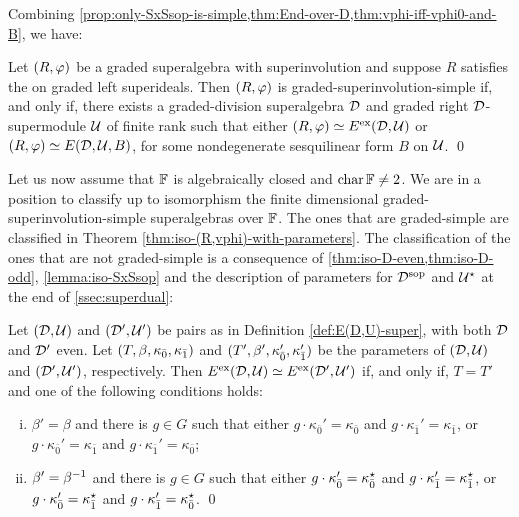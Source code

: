 Combining \cref{prop:only-SxSsop-is-simple,thm:End-over-D,thm:vphi-iff-vphi0-and-B}, we have:

\begin{cor}\label{cor:SxSsop-with-dcc}
    Let $(R, \varphi)$ be a graded superalgebra with superinvolution and suppose $R$ satisfies the \dcc on graded left superideals. 
    Then $(R, \varphi)$ is graded-superinvolution-simple if, and only if, there exists a graded-division superalgebra $\mathcal{D}$ and graded right $\mathcal{D}$-supermodule $\mathcal U$ of finite rank such that either
    $(R, \varphi) \simeq E^{\mathrm{ex}} (\mathcal{D}, \mathcal U)$ or $(R, \varphi) \simeq E(\mathcal{D}, \mathcal U, B)$, for some nondegenerate sesquilinear form $B$ on $\mathcal U$. \qed
\end{cor}

Let us now assume that $\mathbb{F}$ is algebraically closed and $\operatorname{char} \mathbb{F} \neq 2$. 
We are in a position to classify up to isomorphism the finite dimensional graded-superinvolution-simple  superalgebras over $\mathbb{F}$. 
The ones that are graded-simple are classified in Theorem \ref{thm:iso-(R,vphi)-with-parameters}. 
The classification of the ones that are not graded-simple is a consequence of \cref{thm:iso-D-even,thm:iso-D-odd}, \cref{lemma:iso-SxSsop} and the description of parameters for $\mathcal{D}^{\mathrm{sop}}$ and $\mathcal U^\star$ at the end of \cref{ssec:superdual}:

\begin{thm}\label{thm:iso-D-even-ExEsop}
	Let $(\mathcal{D}, \mathcal U)$ and $(\mathcal{D}', \mathcal U')$ be pairs as in Definition \ref{def:E(D,U)-super}, with both $\mathcal{D}$ and $\mathcal{D}'$ even. 
	Let $(T, \beta, \kappa_{\bar{0}}, \kappa_{\bar{1}})$ and $(T', \beta', \kappa_{\bar{0}}', \kappa_{\bar{1}}')$ be the parameters of $(\mathcal{D}, \mathcal U)$ and $(\mathcal{D}', \mathcal U')$, respectively. 
	Then $E^{\mathrm{ex}}(\mathcal{D}, \mathcal U) \simeq E^{\mathrm{ex}}(\mathcal{D}', \mathcal U')$ if, and only if, $T=T'$ and one of the following conditions holds:
	\begin{enumerate}[(i)]
	    \item $\beta'=\beta$ and there is $g\in G$ such that either $g \cdot \kappa_{\bar 0}'=\kappa_{\bar 0}$ and $g \cdot \kappa_{\bar 1}'=\kappa_{\bar 1}$, or $g \cdot \kappa_{\bar 0}'=\kappa_{\bar 1}$ and $g \cdot \kappa_{\bar 1}'=\kappa_{\bar 0}$;
	    \item $\beta'=\beta^{-1}$ and there is $g\in G$ such that either $g \cdot \kappa_{\bar 0}'=\kappa_{\bar 0}^\star$ and $g \cdot \kappa_{\bar 1}'=\kappa_{\bar 1}^\star$, or $g \cdot \kappa_{\bar 0}'=\kappa_{\bar 1}^\star$ and $g \cdot \kappa_{\bar 1}'=\kappa_{\bar 0}^\star$. \qed
	\end{enumerate}
\end{thm}

